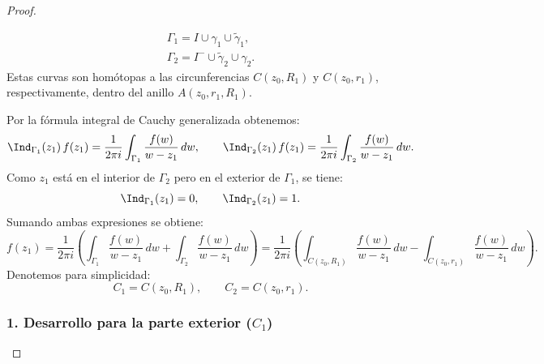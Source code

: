 \begin{proof}
\begin{center}
    \end{center}
    \[
        \begin{matrix}
            \Gamma_1 = I \cup \gamma_1 \cup \tilde{\gamma}_1, \\[4pt]
            \Gamma_2 = I^- \cup \tilde{\gamma}_2 \cup \gamma_2 .
        \end{matrix}
    \]
    Estas curvas son homótopas a las circunferencias $C(z_0,R_1)$ y $C(z_0,r_1)$, respectivamente, dentro del anillo $A(z_0,r_1,R_1)$.

    \medskip

    Por la fórmula integral de Cauchy generalizada obtenemos:
    \[
        \Ind_{\Gamma_1}(z_1)\, f(z_1)
        = \frac{1}{2\pi i} \int_{\Gamma_1} \frac{f(w)}{w-z_1}\, dw,
        \qquad
        \Ind_{\Gamma_2}(z_1)\, f(z_1)
        = \frac{1}{2\pi i} \int_{\Gamma_2} \frac{f(w)}{w-z_1}\, dw.
    \]
    Como $z_1$ está en el interior de $\Gamma_2$ pero en el exterior de $\Gamma_1$, se tiene:
    \[
        \Ind_{\Gamma_1}(z_1)=0, 
        \qquad
        \Ind_{\Gamma_2}(z_1)=1.
    \]
    Sumando ambas expresiones se obtiene:
    \[
        f(z_1)
        = \frac{1}{2\pi i} \left(
            \int_{\Gamma_1} \frac{f(w)}{w-z_1}\, dw
            + \int_{\Gamma_2} \frac{f(w)}{w-z_1}\, dw
            \right)
        = \frac{1}{2\pi i} \left( 
            \int_{C(z_0,R_1)} \frac{f(w)}{w-z_1}\, dw
            - \int_{C(z_0,r_1)} \frac{f(w)}{w-z_1}\, dw
        \right).
    \]
    Denotemos para simplicidad:
    \[
        C_1 = C(z_0,R_1), \qquad C_2 = C(z_0,r_1).
    \]

    \subsubsection*{1. Desarrollo para la parte exterior ($C_1$)}


\end{proof}
